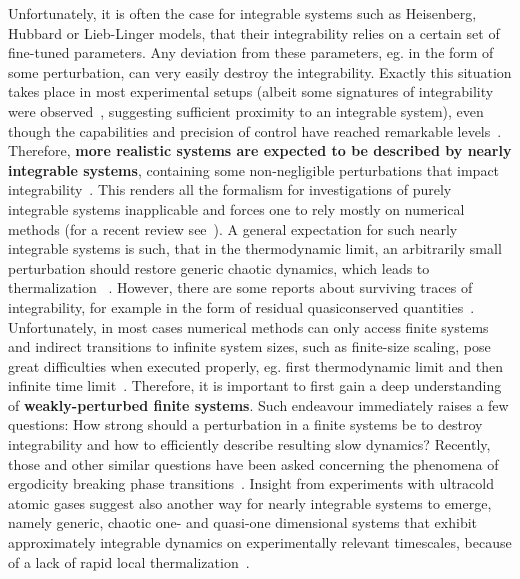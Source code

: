Unfortunately, it is often the case for integrable systems such as Heisenberg, Hubbard or Lieb-Linger
models, that their integrability relies on a certain set of fine-tuned parameters. Any deviation from these parameters, eg.
in the form of some perturbation, can very easily destroy the integrability. Exactly this situation takes place in most
experimental setups (albeit some signatures of integrability were observed~\autocite{Khemani2019}, suggesting sufficient
proximity to an integrable system),  even though the capabilities and precision of control have
reached remarkable levels~\autocite{Browaeys2020}. Therefore, \textbf{more realistic systems
are expected to be described by nearly integrable systems}, containing some non-negligible perturbations that
impact integrability~\autocite{Zotos2004,Brandino2015}.
This renders all the formalism for investigations of purely
integrable systems inapplicable and forces one to rely mostly on numerical methods (for a recent review
see~\textcite{Bertini2021}).
A general expectation for such nearly integrable systems is such, that in the thermodynamic limit, an
arbitrarily small perturbation should restore generic chaotic dynamics, which leads to thermalization
~\autocite{LeBlond2021}. However, there
are some reports about surviving traces of integrability, for example in the form of residual quasiconserved
quantities~\autocite{Brandino2015}. Unfortunately, in most cases numerical methods can only access finite 
systems and indirect transitions to infinite system sizes, such as finite-size scaling, pose great difficulties
when executed properly, eg. first thermodynamic limit and then infinite time limit~\autocite{Sirker2014,CamposVenuti2010}.
Therefore, it is important to first gain a deep understanding of \textbf{weakly-perturbed finite systems}. Such
endeavour immediately raises a few questions: How strong should a perturbation in a finite
systems be to destroy integrability and how to efficiently describe resulting slow dynamics? 
Recently, those and other similar questions have been asked concerning the phenomena of ergodicity breaking
phase transitions~\autocite{Suntajs2020,Suntajs2022}.
Insight from experiments with ultracold atomic gases suggest also another way for nearly integrable systems to emerge,
namely generic, chaotic one- and quasi-one dimensional systems that exhibit approximately integrable dynamics on experimentally relevant timescales,
because of a lack of rapid local thermalization~\autocite{Polkovnikov2011863,Gopalakrishnan2023}.


